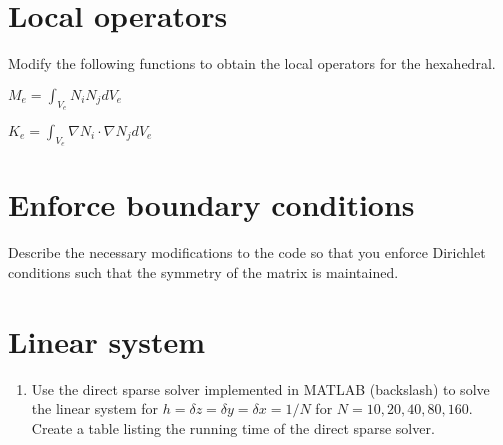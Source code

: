 \documentclass[unicode,11pt,a4paper,oneside,numbers=endperiod,openany]{scrartcl}
\begin{document}
\section{Local operators}
Modify the following functions to obtain the local operators for the hexahedral.
\begin{center}
$\displaystyle M_e = \int_{V_e} N_i N_j d V_e$
\end{center}

\begin{center}
$\displaystyle K_e = \int_{V_e} \nabla N_i \cdot \nabla N_j d V_e$
\end{center}


\section{Enforce boundary conditions}
Describe the necessary modifications to the code so that you enforce 
Dirichlet conditions such that the symmetry of the matrix is maintained.



\section{Linear system}
\begin{enumerate}
\item
Use the direct sparse solver implemented in \small{MATLAB} (backslash)
to solve the linear system for $h = \delta z = \delta y = \delta x = 1/N$ for $N=10,20,40,80,160$.
Create a table listing the running time of the direct sparse solver.
\end{enumerate}
\end{document}
